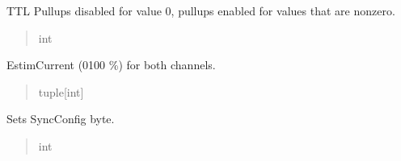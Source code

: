 \documentclass[letterpaper,10pt,english]{sphinxmanual}
\begin{document}
\begin{fulllineitems}
\begin{fulllineitems}
\begin{quote}
\begin{description}
\end{description}\end{quote}

\end{fulllineitems}


\begin{fulllineitems}
\label{\detokenize{PodApi.Parameters:PodApi.Parameters.Params8480SC.Params8480SC.ttlPUllups}}
\pysigstartsignatures
{}
\pysigstopsignatures
\sphinxAtStartPar
TTL Pullups disabled for value 0, pullups enabled for values that are non\sphinxhyphen{}zero.
\begin{quote}\begin{description}
\sphinxAtStartPar
int

\end{description}\end{quote}

\end{fulllineitems}


\begin{fulllineitems}
\label{\detokenize{PodApi.Parameters:PodApi.Parameters.Params8480SC.Params8480SC.estimCurrent}}
\pysigstartsignatures
{}
\pysigstopsignatures
\sphinxAtStartPar
Estim\sphinxhyphen{}Current (0\sphinxhyphen{}100 \%) for both channels.
\begin{quote}\begin{description}
\sphinxAtStartPar
tuple{[}int{]}

\end{description}\end{quote}

\end{fulllineitems}


\begin{fulllineitems}
\label{\detokenize{PodApi.Parameters:PodApi.Parameters.Params8480SC.Params8480SC.syncConfig}}
\pysigstartsignatures
{}
\pysigstopsignatures
\sphinxAtStartPar
Sets Sync\sphinxhyphen{}Config byte.
\begin{quote}\begin{description}
\sphinxAtStartPar
int


\end{description}
\end{quote}
\end{fulllineitems}
\end{fulllineitems}
\end{document}
